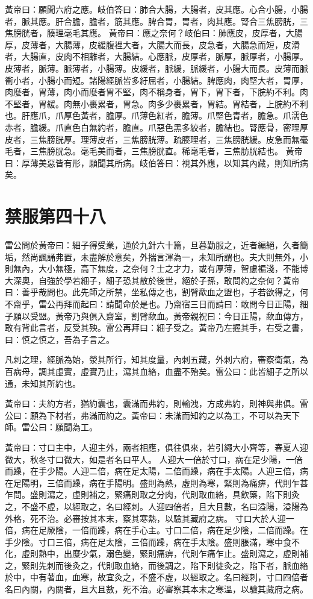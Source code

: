 黃帝曰：願聞六府之應。岐伯答曰：肺合大腸，大腸者，皮其應。心合小腸，小腸者，脈其應。肝合膽，膽者，筋其應。脾合胃，胃者，肉其應。腎合三焦膀胱，三焦膀胱者，腠理毫毛其應。
黃帝曰：應之奈何？岐伯曰：肺應皮，皮厚者，大腸厚，皮薄者，大腸薄，皮緩腹裡大者，大腸大而長，皮急者，大腸急而短，皮滑者，大腸直，皮肉不相離者，大腸結。心應脈，皮厚者，脈厚，脈厚者，小腸厚。皮薄者，脈薄。脈薄者，小腸薄。皮緩者，脈緩，脈緩者，小腸大而長。皮薄而脈衝小者，小腸小而短。諸陽經脈皆多紆屈者，小腸結。脾應肉，肉堅大者，胃厚，肉麼者，胃薄，肉小而麼者胃不堅，肉不稱身者，胃下，胃下者，下脘約不利。肉不堅者，胃緩。肉無小裹累者，胃急。肉多少裹累者，胃結。胃結者，上脘約不利也。肝應爪，爪厚色黃者，膽厚。爪薄色紅者，膽薄。爪堅色青者，膽急。爪濡色赤者，膽緩。爪直色白無約者，膽直。爪惡色黑多絞者，膽結也。腎應骨，密理厚皮者，三焦膀胱厚。理薄皮者，三焦膀胱薄。疏腠理者，三焦膀胱緩。皮急而無毫毛者，三焦膀胱急。毫毛美而者，三焦膀胱直。稀毫毛者，三焦肪胱結也。
黃帝曰：厚薄美惡皆有形，願聞其所病。岐伯答曰：視其外應，以知其內藏，則知所病矣。

\section{禁服第四十八}

雷公問於黃帝曰：細子得受業，通於九針六十篇，旦暮勤服之，近者編絕，久者簡垢，然尚諷誦弗置，未盡解於意矣，外揣言渾為一，未知所謂也。夫大則無外，小則無內，大小無極，高下無度，之奈何？士之才力，或有厚薄，智慮褊淺，不能博大深奧，自強於學若細子，細子恐其散於後世，絕於子孫，敢問約之奈何？黃帝曰：善乎哉問也。此先師之所禁，坐私傳之也，割臂歃血之盟也，子若欲得之，何不齋乎，雷公再拜而起曰：請聞命於是也。乃齋宿三日而請曰：敢問今日正陽，細子願以受盟。黃帝乃與俱入齋室，割臂歃血。黃帝親祝曰：今日正陽，歃血傳方，敢有背此言者，反受其殃。雷公再拜曰：細子受之。黃帝乃左握其手，右受之書，曰：慎之慎之，吾為子言之。

凡刺之理，經脈為始，滎其所行，知其度量，內刺五藏，外刺六府，審察衛氣，為百病母，調其虛實，虛實乃止，瀉其血絡，血盡不殆矣。雷公曰：此皆細子之所以通，未知其所約也。

黃帝曰：夫約方者，猶約囊也，囊滿而弗約，則輸洩，方成弗約，則神與弗俱。雷公曰：願為下材者，弗滿而約之。黃帝曰：未滿而知約之以為工，不可以為天下師。雷公曰：願聞為工。

黃帝曰：寸口主中，人迎主外，兩者相應，俱往俱來，若引繩大小齊等，春夏人迎微大，秋冬寸口微大，如是者名曰平人。
人迎大一倍於寸口，病在足少陽，一倍而躁，在手少陽。人迎二倍，病在足太陽，二倍而躁，病在手太陽。人迎三倍，病在足陽明，三倍而躁，病在手陽明。盛則為熱，虛則為寒，緊則為痛痹，代則乍甚乍問。盛則瀉之，虛則補之，緊痛則取之分肉，代則取血絡，具飲藥，陷下則灸之，不盛不虛，以經取之，名曰經刺。人迎四倍者，且大且數，名曰溢陽，溢陽為外格，死不治。必審按其本末，察其寒熱，以驗其藏府之病。
寸口大於人迎一倍，病在足厥陰，一倍而躁，病在手心主。寸口二倍，病在足少陰，二倍而躁。在手少陰。寸口三倍，病在足太陰，三倍而躁，病在手太陰。盛則脹滿，寒中食不化，虛則熱中，出糜少氣，溺色變，緊則痛痹，代則乍痛乍止。盛則瀉之，虛則補之，緊則先刺而後灸之，代則取血絡，而後調之，陷下則徒灸之，陷下者，脈血絡於中，中有著血，血寒，故宜灸之，不盛不虛，以經取之。名曰經刺，寸口四倍者名曰內關，內關者，且大且數，死不治。必審察其本末之寒溫，以驗其藏府之病。

